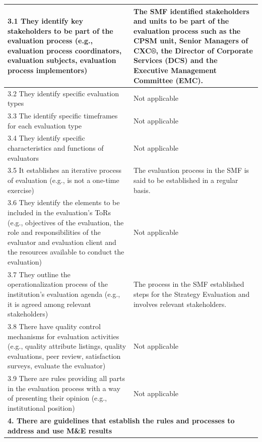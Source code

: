 \documentclass[
  10pt,
]{book}
\begin{document}
\begin{table}
\begin{tabular}[t]{l|l}
\hline
\hspace{1em}3.1 They identify key stakeholders to be part of the evaluation process (e.g., evaluation process coordinators, evaluation subjects, evaluation process implementors) & The SMF identified stakeholders and units to be part of the evaluation process such as the CPSM unit, Senior Managers of CXC®,  the Director of Corporate Services (DCS) and the Executive Management Committee (EMC).\\
\hline
\hspace{1em}3.2 They identify specific evaluation types & Not applicable\\
\hline
\hspace{1em}3.3 The identify specific timeframes for each evaluation type & Not applicable\\
\hline
\hspace{1em}3.4 They identify specific characteristics and functions of evaluators & Not applicable\\
\hline
\hspace{1em}3.5 It establishes an iterative process of evaluation (e.g.,  is not a one-time exercise) & The evaluation process in the SMF is said to be established in a regular basis.\\
\hline
\hspace{1em}3.6 They identify the elements to be included in the evaluation's ToRs (e.g., objectives of the evaluation, the role and responsibilities of the evaluator and evaluation client and the resources available to conduct the evaluation) & Not applicable\\
\hline
\hspace{1em}3.7 They outline the operationalization process of the institution’s evaluation agenda (e.g., it is agreed among relevant stakeholders) & The process in the SMF established steps for the Strategy Evaluation and involves relevant stakeholders.\\
\hline
\hspace{1em}3.8 There have quality control mechanisms for evaluation activities (e.g., quality attribute listings, quality evaluations, peer review, satisfaction surveys, evaluate the evaluator) & Not applicable\\
\hline
\hspace{1em}3.9 There are rules providing all parts in the evaluation process with a way of presenting their opinion (e.g., institutional position) & Not applicable\\
\hline
\multicolumn{2}{l}{\textbf{4. There are guidelines that establish the rules and processes to address and use M\&E results}}\\

\end{tabular}
\end{table}
\end{document}
